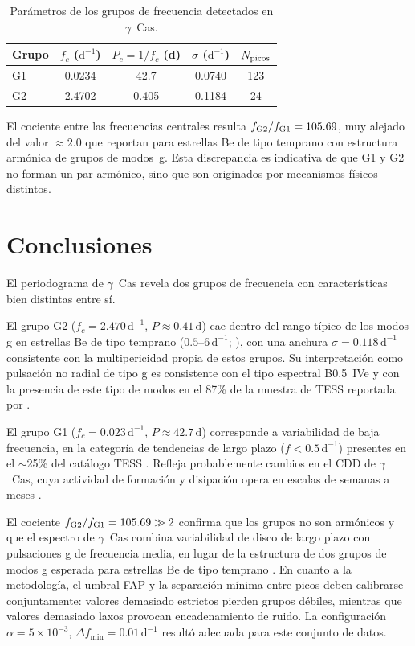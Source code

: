 \documentclass[letterpaper,12pt]{extarticle}
\begin{document}
\begin{table}[H]
    \centering
    \caption{Parámetros de los grupos de frecuencia detectados en $\gamma$~Cas.}
    \label{tab:grupos}
    \begin{tabular}{lcccc}
        \hline\hline
        Grupo & $f_c$ ($\mathrm{d}^{-1}$) & $P_c = 1/f_c$ (d) & $\sigma$ ($\mathrm{d}^{-1}$) & $N_{\rm picos}$ \\
        \hline
        G1 & 0.0234 & 42.7 & 0.0740 & 123 \\
        G2 & 2.4702 & 0.405 & 0.1184 &  24 \\
        \hline
    \end{tabular}
\end{table}

El cociente entre las frecuencias centrales resulta $f_{\rm G2}/f_{\rm G1} = 105.69$, muy alejado del valor $\approx 2.0$ que \cite{labadiebartz2022} reportan para estrellas Be de tipo temprano con estructura armónica de grupos de modos~g. Esta discrepancia es indicativa de que G1 y G2 no forman un par armónico, sino que son originados por mecanismos físicos distintos.


\section{Conclusiones}

El periodograma de $\gamma$~Cas revela dos grupos de frecuencia con características bien distintas entre sí.

El grupo G2 ($f_c = 2.470\,\mathrm{d}^{-1}$, $P \approx 0.41\,\mathrm{d}$) cae dentro del rango típico de los modos g en estrellas Be de tipo temprano ($0.5$--$6\,\mathrm{d}^{-1}$; \cite{labadiebartz2022}), con una anchura $\sigma = 0.118\,\mathrm{d}^{-1}$ consistente con la multipericidad propia de estos grupos. Su interpretación como pulsación no radial de tipo g es consistente con el tipo espectral B0.5~IVe y con la presencia de este tipo de modos en el 87\% de la muestra de TESS reportada por \cite{labadiebartz2022}.

El grupo G1 ($f_c = 0.023\,\mathrm{d}^{-1}$, $P \approx 42.7\,\mathrm{d}$) corresponde a variabilidad de baja frecuencia, en la categoría de tendencias de largo plazo ($f < 0.5\,\mathrm{d}^{-1}$) presentes en el $\sim$25\% del catálogo TESS \cite{labadiebartz2022}. Refleja probablemente cambios en el CDD de $\gamma$~Cas, cuya actividad de formación y disipación opera en escalas de semanas a meses \cite{sabogal2014}.

El cociente $f_{\rm G2}/f_{\rm G1} = 105.69 \gg 2$ confirma que los grupos no son armónicos y que el espectro de $\gamma$~Cas combina variabilidad de disco de largo plazo con pulsaciones g de frecuencia media, en lugar de la estructura de dos grupos de modos g esperada para estrellas Be de tipo temprano \cite{labadiebartz2022}. En cuanto a la metodología, el umbral FAP y la separación mínima entre picos deben calibrarse conjuntamente: valores demasiado estrictos pierden grupos débiles, mientras que valores demasiado laxos provocan encadenamiento de ruido. La configuración $\alpha = 5\times10^{-3}$, $\Delta f_{\min} = 0.01\,\mathrm{d}^{-1}$ resultó adecuada para este conjunto de datos.


\footnotesize



\end{document}
